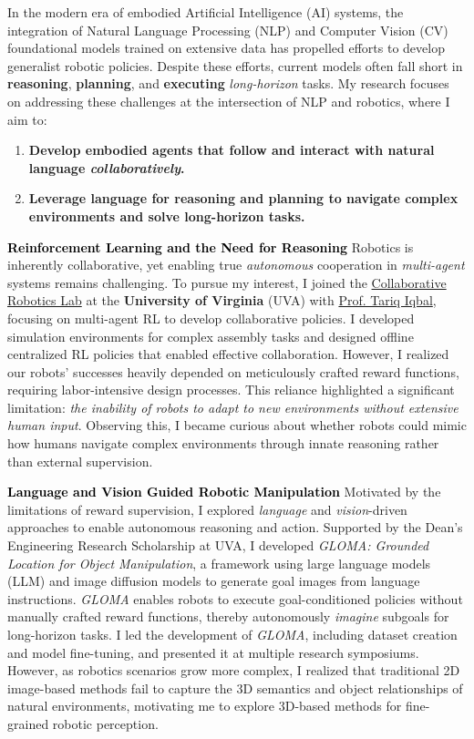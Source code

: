 \documentclass[10pt]{article}
\newcommand{\statement}[1]{\medskip\noindent
  \textcolor{black}{\textbf{#1}}\space
}
\begin{document}
\noindent In the modern era of embodied Artificial Intelligence (AI) systems, the integration of Natural Language Processing (NLP) and Computer Vision (CV) foundational models trained on extensive data has propelled efforts to develop generalist robotic policies. Despite these efforts, current models often fall short in \textbf{reasoning}, \textbf{planning}, and \textbf{executing} \textit{long-horizon} tasks. My research focuses on addressing these challenges at the intersection of NLP and robotics, where I aim to:
\begin{enumerate}[label=(\arabic*), itemindent=0pt, itemsep=0pt, parsep=0pt, nosep]
  \item \textbf{Develop embodied agents that follow and interact with natural language \textit{collaboratively}.}
  \item \textbf{Leverage language for reasoning and planning to navigate complex environments and solve long-horizon tasks.}
\end{enumerate}

\statement{Reinforcement Learning and the Need for Reasoning} Robotics is inherently collaborative, yet enabling true \textit{autonomous} cooperation in \textit{multi-agent} systems remains challenging. To pursue my interest, I joined the \href{https://www.collabrobotics.com/}{Collaborative Robotics Lab} at the \textbf{University of Virginia} (UVA) with \href{https://www.tiqbal.com/}{Prof. Tariq Iqbal}, focusing on multi-agent RL to develop collaborative policies. I developed simulation environments for complex assembly tasks and designed offline centralized RL policies that enabled effective collaboration. However, I realized our robots' successes heavily depended on meticulously crafted reward functions, requiring labor-intensive design processes. This reliance highlighted a significant limitation: \textit{the inability of robots to adapt to new environments without extensive human input}. Observing this, I became curious about whether robots could mimic how humans navigate complex environments through innate reasoning rather than external supervision.

\statement{Language and Vision Guided Robotic Manipulation} Motivated by the limitations of reward supervision, I explored \textit{language} and \textit{vision}-driven approaches to enable autonomous reasoning and action. Supported by the Dean's Engineering Research Scholarship at UVA, I developed \textit{GLOMA: Grounded Location for Object Manipulation}, a framework using large language models (LLM) and image diffusion models to generate goal images from language instructions. \textit{GLOMA} enables robots to execute goal-conditioned policies without manually crafted reward functions, thereby autonomously \textit{imagine} subgoals for long-horizon tasks. I led the development of \textit{GLOMA}, including dataset creation and model fine-tuning, and presented it at multiple research symposiums. However, as robotics scenarios grow more complex, I realized that traditional 2D image-based methods fail to capture the 3D semantics and object relationships of natural environments, motivating me to explore 3D-based methods for fine-grained robotic perception.
\end{document}
